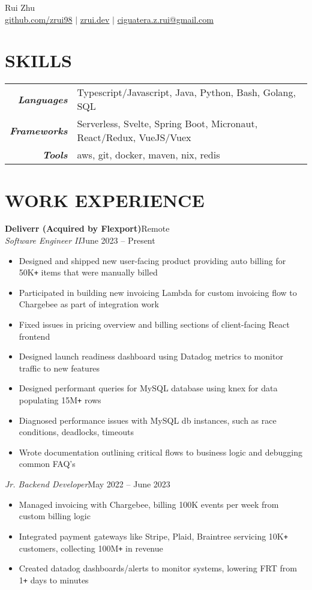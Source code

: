 \documentclass[letterpaper]{article}
\newcommand{\Header}[2]{\begin{center}
	\huge\usefont{OT1}{lmss}{m}{n}
		#1 \\
	\small{#2}
\end{center}}
\newcommand{\SplitEntry}[2]{\textbf{\textit{#1}} & \small{#2}\\}
\newcommand{\NewPart}[1]{\section*{\large\uppercase{\textbf{#1}}}}
\newcommand{\JobEntry}[3]{
	\normalsize\textbf{#1}\hfill\normalsize{#2}\\
	#3\vspace{0.1cm}
}
\newcommand{\DatedEntry}[3]{
	\small\textit{#1}\hfill\small{#2}\\
	\vspace{0.1cm}#3\vspace{0.1cm}
}
\begin{document}
\Header{Rui Zhu}{\href{https://github.com/zrui98}{github.com/zrui98} $|$ \href{https://zrui.dev}{zrui.dev} $|$ \href{mailto:ciguatera.z.rui@gmail.ca}{ciguatera.z.rui@gmail.com}}\vspace{-0.5cm}

\NewPart{Skills}
\begin{tabular}{r|l}
	\SplitEntry{Languages}{Typescript/Javascript, Java, Python, Bash, Golang, SQL}
	\SplitEntry{Frameworks}{Serverless, Svelte, Spring Boot, Micronaut, React/Redux, VueJS/Vuex}
	\SplitEntry{Tools}{aws, git, docker, maven, nix, redis}
\end{tabular}\vspace{-0.2cm}

\NewPart{Work Experience}
\JobEntry{Deliverr (Acquired by Flexport)}
{Remote}
{
	\DatedEntry{Software Engineer II}
	{June 2023 -- Present}
	{
		\begin{itemize}[nolistsep]
			\item Designed and shipped new user-facing product providing auto billing for 50K\texttt{+} items that were manually billed
			\item Participated in building new invoicing Lambda for custom invoicing flow to Chargebee as part of integration work
			\item Fixed issues in pricing overview and billing sections of client-facing React frontend
			\item Designed launch readiness dashboard using Datadog metrics to monitor traffic to new features
			\item Designed performant queries for MySQL database using knex for data populating 15M\texttt{+} rows
			\item Diagnosed performance issues with MySQL db instances, such as race conditions, deadlocks, timeouts
			\item Wrote documentation outlining critical flows to business logic and debugging common FAQ's
		\end{itemize}
	}
	\DatedEntry{Jr. Backend Developer}
	{May 2022 -- June 2023}
	{
		\begin{itemize}[nolistsep]
			\item Managed invoicing with Chargebee, billing 100K events per week from custom billing logic
			\item Integrated payment gateways like Stripe, Plaid, Braintree servicing 10K\texttt{+} customers, collecting 100M\texttt{+} in revenue
			\item Created datadog dashboards/alerts to monitor systems, lowering FRT from 1\texttt{+} days to minutes

\end{itemize}}}
\end{document}
